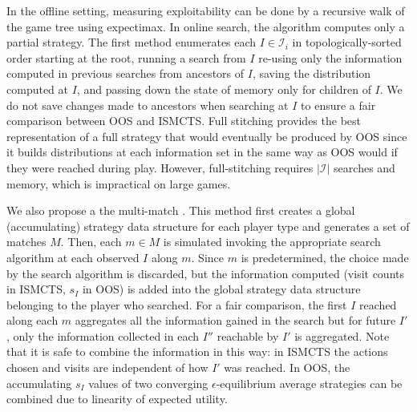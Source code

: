 \documentclass[letterpaper]{article}
\newcommand{\cI}{\mathcal{I}}
\newcommand{\defword}[1]{\textbf{\boldmath{#1}}}
\begin{document}
In the offline setting, measuring exploitability can be done by a recursive walk of the game 
tree using expectimax. In online search, the algorithm computes only 
a partial strategy. 
The first \defword{full stitching} method 
enumerates each $I \in \cI_i$ in topologically-sorted order starting at the root, 
running a search from $I$ re-using only the information computed in previous searches from ancestors of $I$, saving the 
distribution computed at $I$, and passing down the state of memory only for children of $I$. 
We do not save changes made to ancestors when searching at $I$ to ensure 
a fair comparison between OOS and ISMCTS. Full stitching provides the best representation of a full strategy
that would eventually be produced by OOS since it builds distributions at each information set in the 
same way as OOS would if they were reached during play.
However, full-stitching requires $|\cI|$ searches and memory, which is impractical on large games. 

We also propose a the multi-match \defword{aggregate method}. 
This method first creates a global (accumulating) strategy data structure for each player type and generates a 
set of matches $M$. Then, each $m \in M$ is simulated invoking the appropriate search algorithm at each observed 
$I$ along $m$. 
Since $m$ is predetermined, the choice made by the search algorithm is discarded, but the information computed 
(visit counts in ISMCTS, $s_I$ in OOS) is added into the global strategy data structure belonging to the player
who searched. 
For a fair comparison, the first $I$ reached along each $m$ aggregates all the information gained in the search 
but for future $I'$, only the information collected in each $I''$ reachable by $I'$ is aggregated.
Note that it is safe to combine the information in this way: in ISMCTS the actions chosen and visits are independent of 
how $I'$ was reached. In OOS, the accumulating $s_I$ values of two converging $\epsilon$-equilibrium average 
strategies can be combined due to linearity of expected utility. 

 
\end{document}
